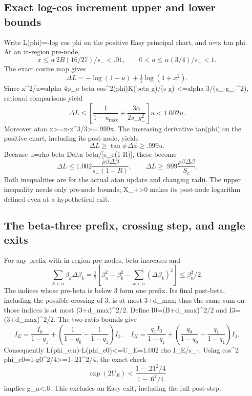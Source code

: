 \documentclass[11pt,a4paper]{article}
\begin{document}
\subsection{Exact log-cos increment upper and lower bounds}

Write L(phi)=-log cos phi on the positive Easy principal chart,
and u=x tan phi. At an in-region pre-node,
\[
 x\le\alpha\,2B(16/27)/s_-<.01,\qquad
 0<u\le\alpha(3/4)/s_-<1.
\]
The exact cosine map gives
\[
 \Delta L=-\log(1-u)+\tfrac12\log(1+x^2).
\]
Since x\textasciicircum{}2/u=alpha 4p\_e beta cos\textasciicircum{}2(phi)K(beta g)/(s g)
<=alpha 3/(s\_-g\_-\textasciicircum{}2), rational comparisons yield
\[
 \Delta L\le\left[\frac1{1-u_{\max}}+
       \frac{3\alpha}{2s_-g_-^2}\right]u<1.002u.
\]
Moreover atan x>=x-x\textasciicircum{}3/3>=.999x. The increasing derivative tan(phi)
on the positive chart, including its post-node, yields
\[
 \Delta L\ge\tan\phi\,\Delta\phi\ge.999u.
\]
Because u=rho beta Delta beta/[s\_e(1-R)], these become
\[
 \Delta L\le1.002\frac{\rho\beta\Delta\beta}{s_-(1-R)},\qquad
 \Delta L\ge.999\frac{\rho\beta\Delta\beta}{S_e}.
\]
Both inequalities are for the actual atan update and changing radii.
The upper inequality needs only pre-node bounds; X\_+>0 makes its post-node
logarithm defined even at a hypothetical exit.

\subsection{The beta-three prefix, crossing step, and angle exits}

For any prefix with in-region pre-nodes, beta increases and
\[
 \sum_{k<n}\beta_k\Delta\beta_k
 =\tfrac12[\beta_n^2-\beta_0^2-\sum_{k<n}(\Delta\beta_k)^2]
 \le\beta_n^2/2.
\]
The indices whose pre-beta is below 3 form one prefix. Its final post-beta,
including the possible crossing of 3, is at most 3+d\_max; thus the same
sum on those indices is at most (3+d\_max)\textasciicircum{}2/2.
Define I0=(B+d\_max)\textasciicircum{}2/2 and I3=(3+d\_max)\textasciicircum{}2/2. The two ratio bounds give
\[
 I_E=\frac{I_0}{1-q_1}
       +\left(\frac1{1-q_0}-\frac1{1-q_1}\right)I_3,\quad
 I_H=\frac{q_1 I_0}{1-q_1}
       +\left(\frac{q_0}{1-q_0}-\frac{q_1}{1-q_1}\right)I_3.
\]
Consequently L(phi\_e,n)-L(phi\_e0)<=U\_E=1.002 rho I\_E/s\_-.
Using cos\textasciicircum{}2 phi\_e0=1-g0\textasciicircum{}2/4>=1-.21\textasciicircum{}2/4, the exact check
\[
 \exp(2U_E)<\frac{1-.21^2/4}{1-.6^2/4}
\]
implies g\_n<.6. This excludes an Easy exit, including the full post-step.
\end{document}
